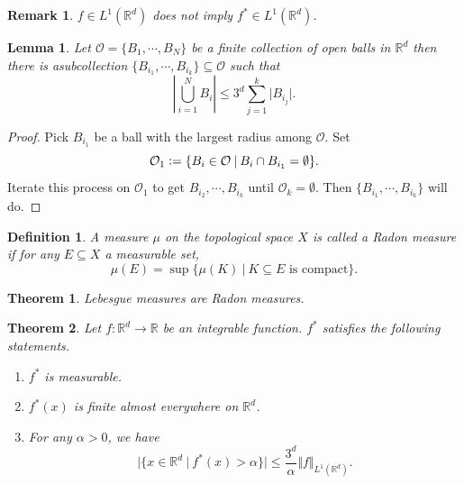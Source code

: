 \documentclass[8pt]{article}
\newtheorem{theorem}{Theorem} [section]
\newtheorem{definition}{Definition}[section]
\newtheorem{lemma}{Lemma}[section]
\newtheorem{remark}{Remark}[section]
\newcommand{\norm}[1]{\Vert #1 \Vert}
\newcommand{\ab}[1]{\vert #1 \vert}
\newcommand{\sep}[0]{\:\vert\:}
\newcommand{\defeq}{\vcentcolon=}
\newcommand{\bR}[0]{\mathbb{R}}
\begin{document}
\begin{remark}
  $f\in L^1(\bR^d)$ does not imply $f^*\in L^1(\bR^d)$.
\end{remark}
\begin{lemma}
  \label{lemma_3_1}
  Let $\mathcal{O} = \{B_1,\cdots,B_N\}$ be a finite collection of open balls in $\bR^d$ then there is asubcollection $\{B_{i_1},\cdots,B_{i_k}\}\subseteq\mathcal{O}$ such that 
  \begin{equation*}
    \left\vert\bigcup_{i=1}^NB_i\right\vert\leq 3^d\sum_{j=1}^k\vert B_{i_j}\vert.
  \end{equation*}
\end{lemma}
\begin{proof}
  Pick $B_{i_1}$ be a ball with the largest radius among $\mathcal{O}$. Set 
  \begin{equation*}
    \mathcal{O}_1\defeq\{B_i\in\mathcal{O}\sep B_i\cap B_{i_1} = \emptyset\}.
  \end{equation*}
  Iterate this process on $\mathcal{O}_1$ to get $B_{i_2},\cdots,B_{i_k}$ until $\mathcal{O}_k = \emptyset$. Then $\{B_{i_1},\cdots,B_{i_k}\}$ will do.
\end{proof}
\begin{definition}
  A measure $\mu$ on the topological space $X$ is called a Radon measure if for any $E\subseteq X$ a measurable set,
  \begin{equation*}
    \mu(E) = \sup\{\mu(K)\sep \text{$K\subseteq E$ is compact}\}.
  \end{equation*}
\end{definition}
\begin{theorem}
  \label{theorem_3_2_1}
  Lebesgue measures are Radon measures.
\end{theorem}
\begin{theorem}
  \label{theorem_3_2}
  Let $f:\bR^d\to\bR$ be an integrable function. $f^*$ satisfies the following statements.
  \begin{enumerate}[1.]
    \item $f^*$ is measurable.
    \item $f^*(x)$ is finite almost everywhere on $\bR^d$.
    \item For any $\alpha>0$, we have 
    \begin{equation*}
      \ab{\{x\in\bR^d\sep f^*(x)>\alpha\}}\leq {\frac {3^d} {\alpha}}\norm{f}_{L^1(\bR^d)}.
    \end{equation*}
  \end{enumerate}
\end{theorem}
\end{document}
